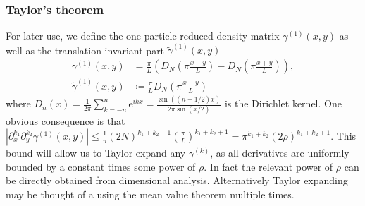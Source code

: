 \documentclass[a4paper,11pt]{article}
\newcommand{\euler}[1]{\text{e}^{#1}}
\newcommand{\abs}[1]{\left\lvert #1 \right\rvert}
\numberwithin{equation}{section}
\begin{document}
	\subsubsection{Taylor's theorem}
	For later use, we define the one particle reduced density matrix $ \gamma^{(1)}(x,y) $ as well as the translation invariant part $ \tilde{\gamma}^{(1)}(x,y) $ \begin{equation}
	\begin{aligned}
	\gamma^{(1)}(x,y)&=\frac{\pi}{L}\left(D_{N}\left(\pi\frac{x-y}{L}\right)-D_{N}\left(\pi\frac{x+y}{L}\right)\right),\\
	\tilde{\gamma}^{(1)}(x,y)&\coloneqq \frac{\pi}{L}D_{N}\left(\pi \frac{x-y}{L}\right)
	\end{aligned}
	\end{equation}
	where $ D_n(x)=\frac{1}{2\pi}\sum_{k=-n}^{n}\euler{ikx}=\frac{\sin((n+1/2)x)}{2\pi\sin(x/2)} $ is the Dirichlet kernel. One obvious consequence is that $ \abs{\partial_{x}^{k_1}\partial_{y}^{k_2}\gamma^{(1)}(x,y)}\leq \frac{1}{\pi}(2N)^{k_1+k_2+1}\left(\frac{\pi}{L}\right)^{k_1+k_2+1}=\pi^{k_1+k_2}(2\rho)^{k_1+k_2+1} $. This bound will allow us to Taylor expand any $ \gamma^{(k)} $, as all derivatives are uniformly bounded by a constant times some power of $ \rho $. In fact the relevant power of $ \rho $ can be directly obtained from dimensional analysis. Alternatively Taylor expanding may be thought of a using the mean value theorem multiple times.
\end{document}
